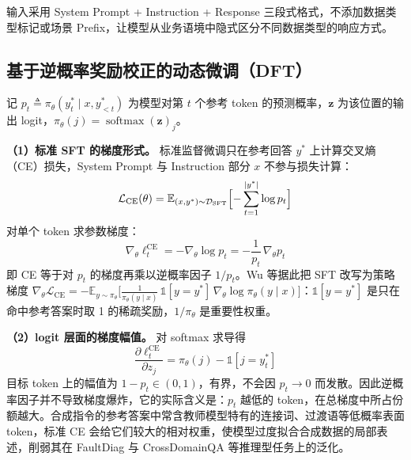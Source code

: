 \documentclass[fontset=fandol,type=master,campus=shenzhen,etitleauto=true]{hithesisbook}
\begin{document}
输入采用 System Prompt + Instruction + Response 三段式格式，不添加数据类型标记或场景 Prefix，让模型从业务语境中隐式区分不同数据类型的响应方式。

\subsection{基于逆概率奖励校正的动态微调（DFT）}\label{ux8badux7ec3ux914dux7f6eux4e0eux4f18ux5316}

记 $p_t \triangleq \pi_\theta(y_t^* \mid x, y_{<t}^*)$ 为模型对第 $t$ 个参考 token 的预测概率，$\mathbf{z}$ 为该位置的输出 logit，$\pi_\theta(j) = \operatorname{softmax}(\mathbf{z})_j$。

\textbf{（1）标准 SFT 的梯度形式。} 标准监督微调只在参考回答 $y^*$ 上计算交叉熵（CE）损失，System Prompt 与 Instruction 部分 $x$ 不参与损失计算：
\begin{equation}
\mathcal{L}_{\text{CE}}(\theta) = \mathbb{E}_{(x, y^*) \sim \mathcal{D}_{\text{SFT}}} \Bigl[ -\sum_{t=1}^{|y^*|} \log p_t \Bigr]
\end{equation}
对单个 token 求参数梯度：
\begin{equation}\label{eq:ce-grad}
\nabla_\theta \ell_t^{\text{CE}} = -\nabla_\theta \log p_t = -\frac{1}{p_t}\,\nabla_\theta p_t
\end{equation}
即 CE 等于对 $p_t$ 的梯度再乘以逆概率因子 $1/p_t$。Wu 等\cite{ref82}据此把 SFT 改写为策略梯度 $\nabla_\theta \mathcal{L}_{\text{CE}} = -\mathbb{E}_{y \sim \pi_\theta}\bigl[\tfrac{1}{\pi_\theta(y \mid x)}\,\mathbb{1}[y = y^*]\,\nabla_\theta \log \pi_\theta(y \mid x)\bigr]$：$\mathbb{1}[y = y^*]$ 是只在命中参考答案时取 1 的稀疏奖励，$1/\pi_\theta$ 是重要性权重。

\textbf{（2）logit 层面的梯度幅值。} 对 softmax 求导得
\begin{equation}\label{eq:ce-logit}
\frac{\partial \ell_t^{\text{CE}}}{\partial z_j} = \pi_\theta(j) - \mathbb{1}[j = y_t^*]
\end{equation}
目标 token 上的幅值为 $1 - p_t \in (0, 1)$，有界，不会因 $p_t \to 0$ 而发散。因此逆概率因子并不导致梯度爆炸，它的实际含义是：$p_t$ 越低的 token，在总梯度中所占份额越大。合成指令的参考答案中常含教师模型特有的连接词、过渡语等低概率表面 token，标准 CE 会给它们较大的相对权重，使模型过度拟合合成数据的局部表述，削弱其在 FaultDiag 与 CrossDomainQA 等推理型任务上的泛化。
\end{document}
